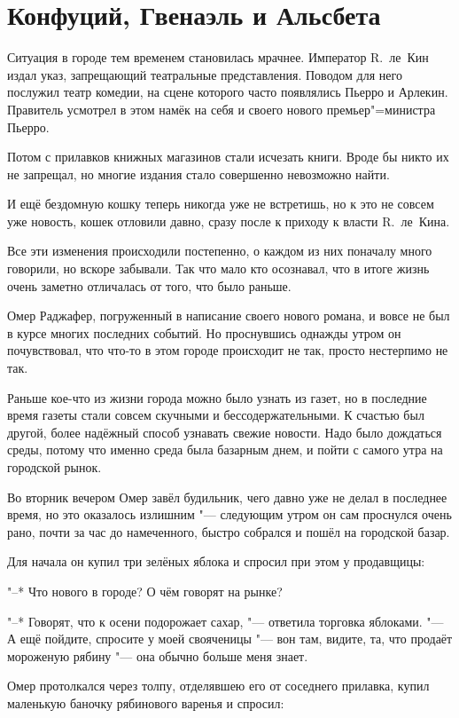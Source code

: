 \section{Конфуций, Гвенаэль и Альсбета}

Ситуация в городе тем временем становилась мрачнее.
Император R.~ле~Кин издал указ, запрещающий театральные представления.
Поводом для него послужил театр комедии, на сцене которого часто появлялись
Пьерро и Арлекин.
Правитель усмотрел в этом намёк на себя и своего нового премьер"=министра
Пьерро.

Потом с прилавков книжных магазинов стали исчезать книги.
Вроде бы никто их не запрещал, но многие издания стало совершенно невозможно
найти.

И ещё бездомную кошку теперь никогда уже не встретишь, но к это не совсем уже
новость, кошек отловили давно, сразу после к приходу к власти R.~ле~Кина.

Все эти изменения происходили постепенно, о каждом из них поначалу много
говорили, но вскоре забывали.
Так что мало кто осознавал, что в итоге жизнь очень заметно отличалась от того,
что было раньше.

Омер Раджафер, погруженный в написание своего нового романа, и вовсе не был в
курсе многих последних событий.
Но проснувшись однажды утром он почувствовал, что что-то в этом городе
происходит не так, просто нестерпимо не так.

Раньше кое-что из жизни города можно было узнать из газет, но в последние время
газеты стали совсем скучными и бессодержательными.
К счастью был другой, более надёжный способ узнавать свежие новости.
Надо было дождаться среды, потому что именно среда была базарным днем, и пойти с
самого утра на городской рынок.

Во вторник вечером Омер завёл будильник, чего давно уже не делал в последнее
время, но это оказалось излишним "--- следующим утром он сам проснулся очень
рано, почти за час до намеченного, быстро собрался и пошёл на городской базар.

Для начала он купил три зелёных яблока и спросил при этом у продавщицы:

"--* Что нового в городе?
О чём говорят на рынке?

"--* Говорят, что к осени подорожает сахар, "--- ответила торговка яблоками.
"--- А ещё пойдите, спросите у моей свояченицы "--- вон там, видите, та, что
продаёт мороженую рябину "--- она обычно больше меня знает.

Омер протолкался через толпу, отделявшею его от соседнего прилавка, купил
маленькую баночку рябинового варенья и спросил:

